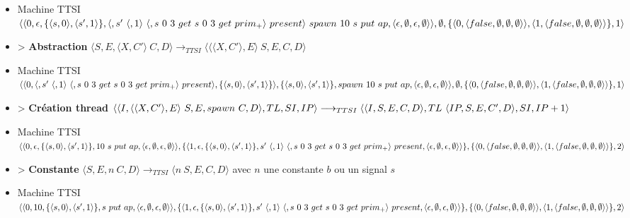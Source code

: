 \documentclass[10pt,a4paper]{report}
\begin{document}
\begin{itemize}
 				\item[] Machine TTSI $\langle\langle 0, \epsilon ,\{\langle s,0\rangle,\langle s',1\rangle\},\langle, s'~\langle,1\rangle~\langle,s~0~3~get~s~0~3~get~prim_{+}\rangle~present\rangle~spawn~10~s~put~ap,\langle\epsilon,\emptyset,\epsilon,\emptyset\rangle\rangle\\,\emptyset,\{\langle 0,\langle false,\emptyset,\emptyset,\emptyset\rangle\rangle,\langle 1,\langle false,\emptyset,\emptyset,\emptyset\rangle\rangle\},1\rangle$
 				\item[] > \textbf{Abstraction} $\langle S,E,\langle X,C'\rangle~C,D\rangle
 				\longrightarrow_{TTSI} 
 				\langle \langle\langle X,C'\rangle,E\rangle~S,E,C,D\rangle$
 				\item[] Machine TTSI $\langle\langle 0, \langle, s'~\langle,1\rangle~\langle,s~0~3~get~s~0~3~get~prim_{+}\rangle~present\rangle,\{\langle s,0\rangle,\langle s',1\rangle\}\rangle ,\{\langle s,0\rangle,\langle s',1\rangle\},spawn~10~s~put~ap,\\\langle\epsilon,\emptyset,\epsilon,\emptyset\rangle\rangle,\emptyset,\{\langle 0,\langle false,\emptyset,\emptyset,\emptyset\rangle\rangle,\langle 1,\langle false,\emptyset,\emptyset,\emptyset\rangle\rangle\},1\rangle$
 				\item[] > \textbf{Création thread} $\langle\langle I,\langle\langle X,C'\rangle, E\rangle~S,E,spawn~C,D\rangle,TL,SI,IP\rangle 
 				\longrightarrow_{TTSI} 
 				\\\langle\langle I,S,E,C,D\rangle,TL~\langle IP,S,E,C',D\rangle,SI,IP+1\rangle$
 				\item[] Machine TTSI $\langle\langle 0,\epsilon,\{\langle s,0\rangle,\langle s',1\rangle\},10~s~put~ap,\langle\epsilon,\emptyset,\epsilon,\emptyset\rangle\rangle,\{\langle 1,\epsilon,\{\langle s,0\rangle,\langle s',1\rangle\}, s'~\langle,1\rangle~\langle,s~0~3~get~s~0~3~get~prim_{+}\rangle~present ,\\\langle\epsilon,\emptyset,\epsilon,\emptyset\rangle\rangle\},\{\langle 0,\langle false,\emptyset,\emptyset,\emptyset\rangle\rangle,\langle 1,\langle false,\emptyset,\emptyset,\emptyset\rangle\rangle\},2\rangle$
 				\item[] > \textbf{Constante} $\langle S,E,n~C,D\rangle 
 				\longrightarrow_{TTSI} 
 				\langle n~S,E,C,D\rangle$ avec $n$ une constante $b$ ou un signal $s$
 				\item[] Machine TTSI $\langle\langle 0,10,\{\langle s,0\rangle,\langle s',1\rangle\},s~put~ap,\langle\epsilon,\emptyset,\epsilon,\emptyset\rangle\rangle,\{\langle 1,\epsilon,\{\langle s,0\rangle,\langle s',1\rangle\}, s'~\langle,1\rangle~\langle,s~0~3~get~s~0~3~get~prim_{+}\rangle~present ,\\\langle\epsilon,\emptyset,\epsilon,\emptyset\rangle\rangle\},\{\langle 0,\langle false,\emptyset,\emptyset,\emptyset\rangle\rangle,\langle 1,\langle false,\emptyset,\emptyset,\emptyset\rangle\rangle\},2\rangle$

\end{itemize}
\end{document}
